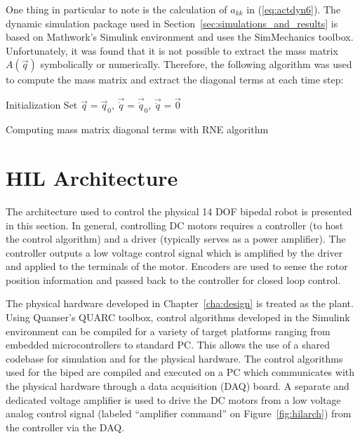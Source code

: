 One thing in particular to note is the calculation of $a_{kk}$ in (\ref{eq:actdyn6}). The dynamic simulation package used in Section~\ref{sec:simulations_and_results} is based on Mathwork's Simulink environment and uses the SimMechanics toolbox. Unfortunately, it was found that it is not possible to extract the mass matrix $A(\vec{q})$ symbolically or numerically. Therefore, the following algorithm was used to compute the mass matrix and extract the diagonal terms at each time step: 

\begin{algorithm}[H]
 \SetAlgoLined
 Initialization\;
 Set $\vec{q} = \vec{q}_0$, $\vec{\dot q} = \vec{\dot q}_0$, $\vec{\ddot q} = \vec{0}$\;
 \caption{Computing mass matrix diagonal terms with RNE algorithm}
 \label{alg:massdiag}
\end{algorithm}


\section{HIL Architecture} %
\label{sec:hil_architecture}
The architecture used to control the physical 14 DOF bipedal robot is presented in this section. In general, controlling DC motors requires a controller (to host the control algorithm) and a driver (typically serves as a power amplifier). The controller outputs a low voltage control signal which is amplified by the driver and applied to the terminals of the motor. Encoders are used to sense the rotor position information and passed back to the controller for closed loop  control. 

The physical hardware developed in Chapter~\ref{cha:design} is treated as the plant. Using Quanser's QUARC toolbox, control algorithms developed in the Simulink environment can be compiled for a variety of target platforms ranging from embedded microcontrollers to standard PC. This allows the use of a shared codebase for simulation and for the physical hardware. The control algorithms used for the biped are compiled and executed on a PC which communicates with the physical hardware through a data acquisition (DAQ) board. A separate and dedicated voltage amplifier is used to drive the DC motors from a low voltage analog control signal (labeled ``amplifier command'' on Figure~\ref{fig:hilarch}) from the controller via the DAQ. 

